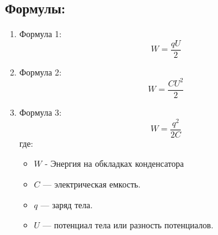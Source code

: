 \documentclass[a4paper,12pt]{article}
\begin{document}
\vspace{-9pt}
\subsection*{Формулы:}
\vspace{-3pt}
\begin{enumerate}[itemsep=0pt, topsep=0pt, parsep=3pt]
  \item Формула 1:
  \vspace{-0.05em}
  $$ W = \frac{qU}{2} $$
  \item Формула 2:
  \vspace{-0.05em}
  $$ W = \frac{CU^2}{2} $$
  \item Формула 3:
  \vspace{-0.05em}
  $$ W = \frac{q^2}{2C} $$
  где:
  \begin{itemize} [itemsep=0pt, topsep=0pt, parsep=0pt]
    \item $W$ - Энергия на обкладках конденсатора
    \item $C$ — электрическая емкость.
    \item $q$ — заряд тела.
    \item $U$ — потенциал тела или разность потенциалов.
  \end{itemize}
\end{enumerate}
\end{document}
